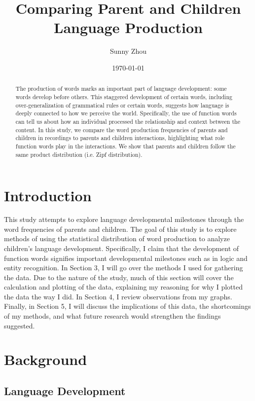 \documentclass{article}
\title{Comparing Parent and Children Language Production}
\author{Sunny Zhou}
\affil{Department of Linguistics\\University of California, Davis}
\date{\today}
\theoremstyle{plain}
\theoremstyle{definition}
\theoremstyle{remark}
\numberwithin{equation}{section}
\begin{document}
\maketitle
\begin{abstract}
The production of words marks an important part of language development: some words develop before others. This staggered development of certain words, including over-generalization of grammatical rules or certain words, suggests how language is deeply connected to how we perceive the world. Specifically, the use of function words can tell us about how an individual processed the relationship and context between the content. In this study, we compare the word production frequencies of parents and children in recordings to parents and children interactions, highlighting what role function words play in the interactions. We show that parents and children follow the same product distribution (i.e. Zipf distribution).
\end{abstract}

\section{Introduction}

This study attempts to explore language developmental milestones through the word frequencies of parents and children. The goal of this study is to explore methods of using the statistical distribution of word production to analyze children's language development. Specifically, I claim that the development of function words signifies important developmental milestones such as in logic and entity recognition. In Section 3, I will go over the methods I used for gathering the data. Due to the nature of the study, much of this section will cover the calculation and plotting of the data, explaining my reasoning for why I plotted the data the way I did. In Section 4, I review observations from my graphs. Finally, in Section 5, I will discuss the implications of this data, the shortcomings of my methods, and what future research would strengthen the findings suggested.

\section{Background}
\subsection{Language Development}
\end{document}

